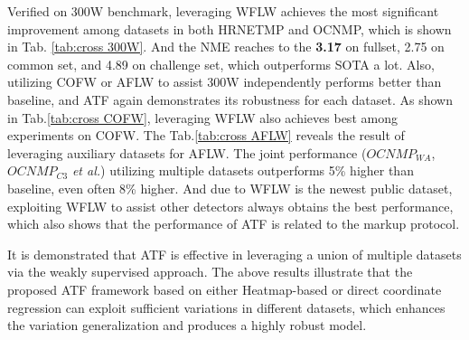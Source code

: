 \documentclass[journal,transmag]{IEEEtran}
\begin{document}
Verified on 300W\cite{300W} benchmark, leveraging WFLW achieves the most significant improvement among datasets in both HRNETMP and OCNMP, 
which is shown in Tab. \ref{tab:cross 300W}.
And the NME reaches to the {\bf 3.17} on fullset, 2.75 on common set, and 4.89 on challenge set, which outperforms SOTA a lot.
Also, utilizing COFW or AFLW to assist 300W independently performs better than baseline, and ATF again demonstrates its robustness for each dataset.
As shown in Tab.\ref{tab:cross COFW}, leveraging WFLW also achieves best among experiments on COFW.
The Tab.\ref{tab:cross AFLW} reveals the result of leveraging auxiliary datasets for AFLW.
The joint performance ($OCNMP_{WA}$, $OCNMP_{C3}$ \emph{et al.}) utilizing multiple datasets outperforms 5\% higher than baseline, even often 8\% higher.
And due to WFLW is the newest public dataset, exploiting WFLW to assist other detectors always obtains the best performance, 
which also shows that the performance of ATF is related to the markup protocol.


It is demonstrated that ATF is effective in leveraging a union of multiple datasets via the weakly supervised approach.
The above results illustrate that the proposed ATF framework based on either Heatmap-based or direct coordinate regression can exploit sufficient variations in different datasets,
which enhances the variation generalization and produces a highly robust model.
\end{document}
